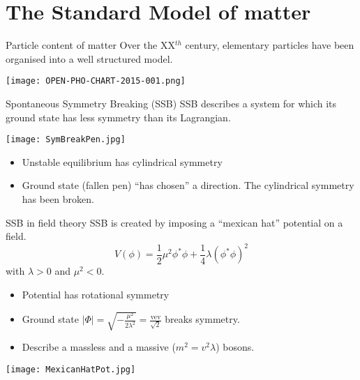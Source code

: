 \section{The Standard Model of matter}
\begin{frame}{Particle content of matter}
    Over the XX$^{th}$ century, elementary particles have been organised into a well structured model.

  \begin{center} \texttt{[image: OPEN-PHO-CHART-2015-001.png]} \end{center}
\end{frame}
\begin{frame}{Spontaneous Symmetry Breaking (SSB)}
  SSB describes a system for which its ground state has less symmetry than its Lagrangian.

  \texttt{[image: SymBreakPen.jpg]}
  \begin{itemize}
  \item Unstable equilibrium has cylindrical symmetry
  \item Ground state (fallen pen) ``has chosen'' a direction.
    The cylindrical symmetry has been broken.
  \end{itemize}
\end{frame}
\begin{frame}{SSB in field theory}
  SSB is created by imposing a ``mexican hat'' potential on a field.
  \begin{equation}
    \label{eq:orgdea495d}
    V(\phi) = \frac{1}{2}\mu^2\phi^*\phi+\frac{1}{4}\lambda(\phi^*\phi)^2
  \end{equation}
  with  $\lambda>0$ and $\mu^2 <0$.
  
  \begin{minipage}{0.49\linewidth}
  \begin{itemize}
  \item Potential has rotational symmetry
  \item Ground state $|\Phi|=\sqrt{-\frac{\mu^2}{2\lambda^2}}= \frac{\text{vev}}{\sqrt{2}}$ breaks symmetry.
  \item Describe a massless and a massive ($m^2=v^2\lambda$) bosons.
  \end{itemize}
  \end{minipage}
  \hfill
  \begin{minipage}{0.49\linewidth}
    \texttt{[image: MexicanHatPot.jpg]}
  \end{minipage}
\end{frame}
